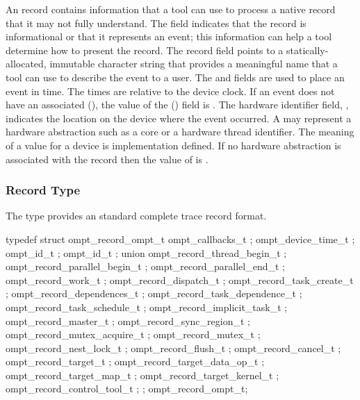 An  record contains information that a tool can 
use to process a native record that it may not fully understand. The  
field indicates that the record is informational or that it represents an event; 
this information can help a tool determine how to present the record. The record 
 field points to a statically-allocated, immutable character string that 
provides a meaningful name that a tool can use to describe the event to a user. 
The  and  fields are used to place an event in time. 
The times are relative to the device clock. If an event does not have an associated 
 (), the value of the  ()
field is . The hardware identifier field, , indicates 
the location on the device where the event occurred. A  may represent a 
hardware abstraction such as a core or a hardware thread identifier. The meaning of 
a  value for a device is implementation defined. If no hardware abstraction 
is associated with the record then the value of  is .

\subsubsection{Record Type}
\label{sec:ompt_record_ompt_t}

\summary
The  type provides an standard complete trace record format.

\format
\begin{ccppspecific}
\begin{omptRecord}
typedef struct ompt_record_ompt_t {
  ompt_callbacks_t ;
  ompt_device_time_t ;
  ompt_id_t ;
  ompt_id_t ;
  union {
    ompt_record_thread_begin_t ;
    ompt_record_parallel_begin_t ;
    ompt_record_parallel_end_t ;
    ompt_record_work_t ;
    ompt_record_dispatch_t ;
    ompt_record_task_create_t ;
    ompt_record_dependences_t ;
    ompt_record_task_dependence_t ;
    ompt_record_task_schedule_t ;
    ompt_record_implicit_task_t ;
    ompt_record_master_t ;
    ompt_record_sync_region_t ;
    ompt_record_mutex_acquire_t ;
    ompt_record_mutex_t ;
    ompt_record_nest_lock_t ;
    ompt_record_flush_t ;
    ompt_record_cancel_t ;
    ompt_record_target_t ;
    ompt_record_target_data_op_t ;
    ompt_record_target_map_t ;
    ompt_record_target_kernel_t ;
    ompt_record_control_tool_t ;
  } ;
} ompt_record_ompt_t;
\end{omptRecord}
\end{ccppspecific}

